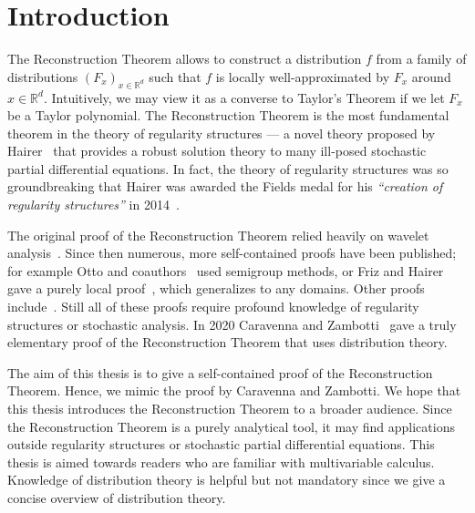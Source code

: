 \chapter{Introduction} 

The Reconstruction Theorem allows to construct a distribution \(f\) from a family of distributions \({(F_{x})}_{x \in \mathbb{R}^d}\) such that \(f\) is locally well-approximated by \(F_x\) around \(x \in \mathbb{R}^d\). Intuitively, we may view it as a converse to Taylor's Theorem if we let \(F_x\) be a Taylor polynomial. The Reconstruction Theorem is the most fundamental theorem in the theory of regularity structures --- a novel theory proposed by Hairer~\cite{hairer2014theory} that provides a robust solution theory to many ill-posed stochastic partial differential equations. In fact, the theory of regularity structures was so groundbreaking that Hairer was awarded the Fields medal for his \emph{``creation of regularity structures''} in 2014~\cite{FieldsMedalHairer}.

The original proof of the Reconstruction Theorem relied heavily on wavelet analysis~\cite{hairer2017reconstruction}. Since then numerous, more self-contained proofs have been published; for example Otto and coauthors~\cite{otto2019quasilinear} used semigroup methods, or Friz and Hairer gave a purely local proof~\cite{friz2020course}, which generalizes to any domains. Other proofs include~\cite{gubinelli2015paracontrolled, martin2020littlewood, singh2018elementary}. Still all of these proofs require profound knowledge of regularity structures or stochastic analysis. In 2020 Caravenna and Zambotti~\cite{caravenna2021hairer} gave a truly elementary proof of the Reconstruction Theorem that uses distribution theory. 

The aim of this thesis is to give a self-contained proof of the Reconstruction Theorem. Hence, we mimic the proof by Caravenna and Zambotti. We hope that this thesis introduces the Reconstruction Theorem to a broader audience. Since the Reconstruction Theorem is a purely analytical tool, it may find applications outside regularity structures or stochastic partial differential equations. This thesis is aimed towards readers who are familiar with multivariable calculus. Knowledge of distribution theory is helpful but not mandatory since we give a concise overview of distribution theory.


